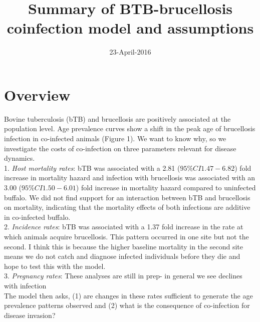 \documentclass[letterpaper,12pt]{article}
\begin{document}
\linenumbers

\title{Summary of BTB-brucellosis coinfection model and assumptions}
\date{23-April-2016}

\maketitle
\doublespacing

\section*{Overview}
Bovine tuberculosis (bTB) and brucellosis are positively associated at the population level.   Age prevalence curves show a shift in the peak age of brucellosis infection in co-infected animals (Figure 1).  We want to know why, so we investigate the costs of co-infection on three parameters relevant for disease dynamics. \\
1. \textit{Host mortality rates}: bTB was associated with a 2.81 ($95\% CI 1.47-6.82$) fold increase in mortality hazard and infection with brucellosis was associated with an 3.00 ($95\% CI 1.50-6.01$) fold increase in mortality hazard compared to uninfected buffalo.  We did not find support for an interaction between bTB and brucellosis on mortality, indicating that the mortality effects of both infections are additive in co-infected buffalo.   \\
2. \textit{Incidence rates}:  bTB was associated with a 1.37 fold increase in the rate at which animals acquire brucellosis.   This pattern occurred in one site but not the second.  I think this is because the higher baseline mortality in the second site means we do not catch and diagnose infected individuals before they die and hope to test this with the model.\\
3. \textit{Pregnancy rates}:  These analyses are still in prep- in general we see declines with infection \\
The model then asks, (1) are changes in these rates sufficient to generate the age prevalence patterns observed and (2) what is the consequence of co-infection for disease invasion?
\end{document}
